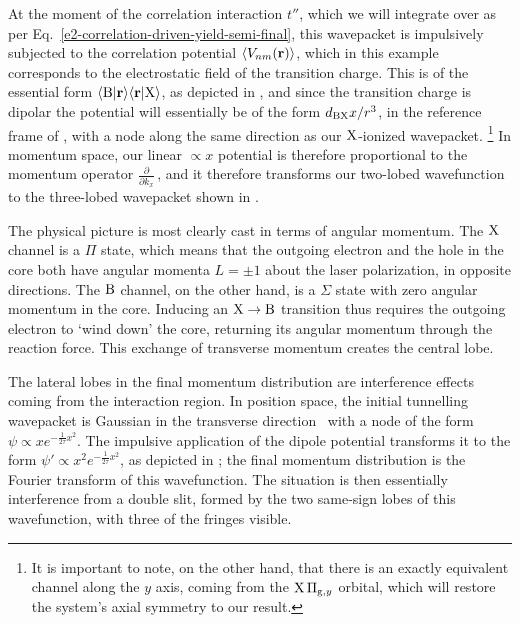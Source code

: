 At the moment of the correlation interaction $t''$, which we will integrate over as per Eq.~\eqref{e2-correlation-driven-yield-semi-final}, this wavepacket is impulsively subjected to the correlation potential $\left\langle V_{nm}\mathopen{}\left( \vb{r} \right)\mathclose{} \right\rangle$, which in this example corresponds to the electrostatic field of the transition charge. This is of the essential form $\braket{\mathrm{B}}{\vb{r}} \! \braket{\vb{r}}{\mathrm{X}}$, as depicted in , and since the transition charge is dipolar the potential will essentially be of the form $d_{\mathrm{B}\mathrm{X}}x/r^3$, in the reference frame of , with a node along the same direction as our $\mathrm{X}$-ionized wavepacket.%
\footnote{%
It is important to note, on the other hand, that there is an exactly equivalent channel along the $y$ axis, coming from the $\mathrm{X}\,\Pi_{\mathrm{g},y}$ orbital, which will restore the system's axial symmetry to our result.
}
In momentum space, our linear $\propto x$ potential is therefore proportional to the momentum operator $\frac{\partial}{\partial k_x\!\!\!{}}\,$, and it therefore transforms our two-lobed wavefunction to the three-lobed wavepacket shown in .


The physical picture is most clearly cast in terms of angular momentum. The $\mathrm{X}$ channel is a $\Pi$ state, which means that the outgoing electron and the hole in the core both have angular momenta $L=\pm 1$ about the laser polarization, in opposite directions. The $\mathrm{B}$ channel, on the other hand, is a $\Sigma$ state with zero angular momentum in the core. Inducing an $\mathrm{X}\rightarrow\mathrm{B}$ transition thus requires the outgoing electron to `wind down' the core, returning its angular momentum through the reaction force. This exchange of transverse momentum creates the central lobe.


The lateral lobes in the final momentum distribution are interference effects coming from the interaction region. In position space, the initial tunnelling wavepacket is Gaussian in the transverse direction~\cite{ivanov_anatomy_2005} with a node of the form $\psi\propto x e^{-\frac{1}{2\tau}x^2}$. The impulsive application of the dipole potential transforms it to the form $\psi'\propto x^2 e^{-\frac{1}{2\tau}x^2}$, as depicted in ; the final momentum distribution is the Fourier transform of this wavefunction. The situation is then essentially interference from a double slit, formed by the two same-sign lobes of this wavefunction, with three of the fringes visible.










